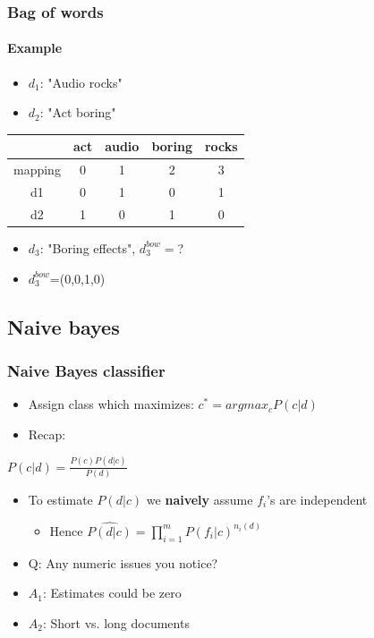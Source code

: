 \documentclass{beamer}
\begin{document}
\begin{frame}
	\frametitle{Bag of words}
	\framesubtitle{Example}
	\begin{itemize}
		\item $d_1$: "Audio rocks"
		\item $d_2$: "Act boring"
	\end{itemize}
	\begin{center}
	\begin{table}
		\begin{tabular}{c|c|c|c|c}
			& act & audio & boring & rocks \\ \hline \hline
			mapping & 0 & 1 & 2 & 3 \\ \hline
			d1 & 0 & 1 & 0 & 1 \\
			d2 & 1 & 0 & 1 & 0
		\end{tabular}
	\end{table}
	\end{center}
	
	\begin{itemize}
		\item $d_3$: "Boring effects", $d_3^{bow}=$? \pause
		\item $d_3^{bow}$=(0,0,1,0)
	\end{itemize}
\end{frame}

\subsection{Naive bayes}
\begin{frame}
	\frametitle{Naive Bayes classifier}
	\begin{itemize}
		\item Assign class which maximizes: $c^{*}=argmax_{c} P(c|d)$
		\pause
		\item Recap:
	\end{itemize}
	
	\begin{Definition}
		\center
		$P(c|d) = \frac{P(c)P(d|c)}{P(d)}$
	\end{Definition}
	\pause
	\begin{itemize}
		\item To estimate $P(d|c)$ we \textbf{naively} assume $f_i$'s are independent
		\pause
		\begin{itemize}
			\item Hence $\widehat{P(d|c)}=\prod_{i=1}^{m}P(f_i|c)^{n_i(d)}$ 
		\end{itemize}
		\pause
		\item Q: Any numeric issues you notice?
		\pause
		\item $A_1$: Estimates could be zero
		\pause
		\item $A_2$: Short vs. long documents
	\end{itemize}
\end{frame}
\end{document}
